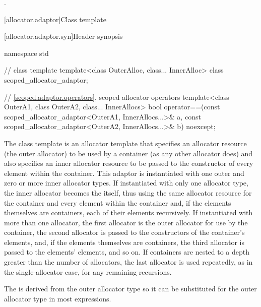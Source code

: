 \begin{itemdescr}
\pnum
\returns
{}.
\end{itemdescr}


[allocator.adaptor]{Class template }

[allocator.adaptor.syn]{Header  synopsis}

%
\begin{codeblock}
namespace std {
  // class template 
  template<class OuterAlloc, class... InnerAlloc>
    class scoped_allocator_adaptor;

  // \ref{scoped.adaptor.operators}, scoped allocator operators
  template<class OuterA1, class OuterA2, class... InnerAllocs>
    bool operator==(const scoped_allocator_adaptor<OuterA1, InnerAllocs...>& a,
                    const scoped_allocator_adaptor<OuterA2, InnerAllocs...>& b) noexcept;
}
\end{codeblock}

\pnum
The class template  is an allocator template that
specifies an allocator resource (the outer allocator) to be used by a container (as any
other allocator does) and also specifies an inner allocator resource to be passed to the
constructor of every element within the container. This adaptor is instantiated with one
outer and zero or more inner allocator types. If instantiated with only one allocator
type, the inner allocator becomes the  itself, thus
using the same allocator resource for the container and every element within the
container and, if the elements themselves are containers, each of their elements
recursively. If instantiated with more than one allocator, the first allocator is the
outer allocator for use by the container, the second allocator is passed to the
constructors of the container's elements, and, if the elements themselves are
containers, the third allocator is passed to the elements' elements, and so on. If
containers are nested to a depth greater than the number of allocators, the last
allocator is used repeatedly, as in the single-allocator case, for any remaining
recursions.
\begin{note}
The  is derived from the outer
allocator type so it can be substituted for the outer allocator type in most
expressions.
\end{note}

